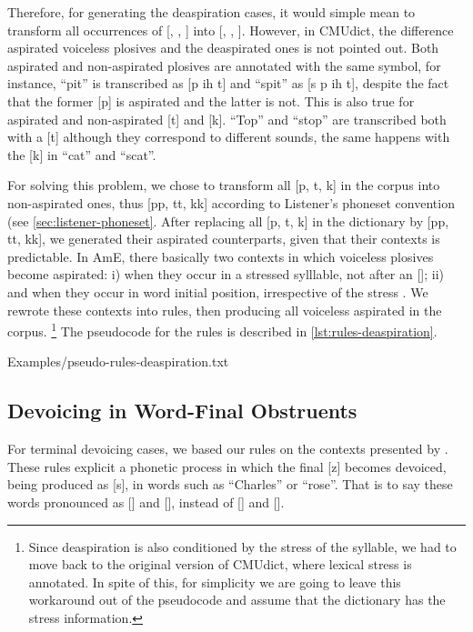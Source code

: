 Therefore, for generating the deaspiration cases, it would simple mean to transform all occurrences of
[, , ] into [, , ]. However,
in \ac{CMUdict}, the difference aspirated voiceless plosives and the deaspirated ones is not pointed out. Both aspirated and 
non-aspirated plosives are annotated with the same
symbol, for instance, ``pit'' is transcribed as [p ih t] and ``spit'' as [s p ih t], despite the fact that the former [p] is aspirated 
and the latter is not. This is also true for aspirated and non-aspirated [t] and [k]. ``Top'' and ``stop'' are transcribed both with a [t]
although they correspond to different sounds, the same happens with the [k] in ``cat'' and ``scat''.

For solving this problem, we chose to transform all [p, t, k] in the corpus into non-aspirated ones, thus [pp, tt, kk] according
to Listener's phoneset convention (see \autoref{sec:listener-phoneset}. After replacing all [p, t, k] in the dictionary by
[pp, tt, kk], we generated their aspirated counterparts, given that their contexts is predictable. In \ac{AmE}, there basically 
two contexts in which voiceless plosives become aspirated: i) when they occur in a stressed sylllable, not after an []; 
ii) and when they occur in word initial position, irrespective of the stress \citep{Lisker1985}. We rewrote these contexts 
into rules, then producing all voiceless aspirated in the corpus.
\footnote{Since deaspiration is also conditioned by the stress of the syllable, we had to move back to the original version of \ac{CMUdict}, 
where lexical stress is annotated. In spite of this, for simplicity we are going to leave this workaround out of the pseudocode 
and assume that the dictionary has the stress information.} The pseudocode for the rules is described in \autoref{lst:rules-deaspiration}.

%
    {Examples/pseudo-rules-deaspiration.txt}
    
    
\clearpage
\subsection{Devoicing in Word-Final Obstruents}

For terminal devoicing cases, we based our rules on the contexts presented by \citeauthor{Castilho2004} \citep{Castilho2004}.
These rules explicit a phonetic process in which the final [z] becomes devoiced, being produced as [s], in words such as ``Charles'' 
or ``rose''. That is to say these words pronounced as [] and [], instead of [] 
and [].

